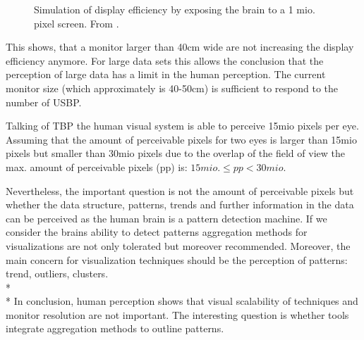 \begin{figure}[H]
    \centering
    \caption{Simulation of display efficiency by exposing the brain to a 1 mio. pixel screen. From \cite{Ware2012a}.}
    \label{fig:DE}
\end{figure}

This shows, that a monitor larger than 40cm wide are not increasing the display efficiency anymore. For large data sets this allows the conclusion that the perception of large data has a limit in the human perception. The current monitor size (which approximately is  40-50cm) is sufficient to respond to the number of USBP.

Talking of TBP  the human visual system is able to perceive 15mio pixels per eye\cite{Deering1998}. Assuming that the amount of perceivable pixels for two eyes is larger than 15mio pixels but smaller than 30mio pixels due to the overlap of the field of view the max. amount of perceivable pixels (pp) is:
\begin{math}
15 mio. \leq pp < 30 mio.
\end{math}

Nevertheless, the important question is not the amount of perceivable pixels but whether the data structure, patterns, trends and further information in the data can be perceived as the human brain is a pattern detection machine\cite{Ware2012a}. If we consider the brains ability to detect patterns aggregation methods for visualizations are not only tolerated but moreover recommended. Moreover, the main concern for visualization techniques should be the perception of patterns: trend, outliers, clusters. 
\\*
\\*
In conclusion, human perception shows that visual scalability of techniques and monitor resolution are not important. The interesting question is whether tools integrate aggregation methods to outline patterns.


